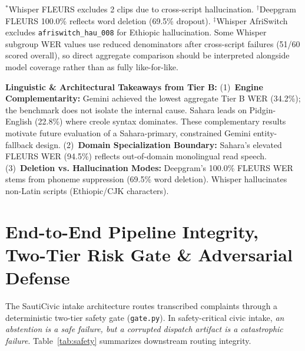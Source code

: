 \documentclass[9pt,a4paper]{extarticle}
\begin{document}
\vspace{1pt}
{\scriptsize $^*$Whisper FLEURS excludes 2 clips due to cross-script hallucination. $^\dagger$Deepgram FLEURS 100.0\% reflects word deletion (69.5\% dropout). $^\ddagger$Whisper AfriSwitch excludes \texttt{afriswitch\_hau\_008} for Ethiopic hallucination. Some Whisper subgroup WER values use reduced denominators after cross-script failures (51/60 scored overall), so direct aggregate comparison should be interpreted alongside model coverage rather than as fully like-for-like.}

\textbf{Linguistic \& Architectural Takeaways from Tier B:}
(1)~\textbf{Engine Complementarity:} Gemini achieved the lowest aggregate Tier B WER (34.2\%); the benchmark does not isolate the internal cause. Sahara leads on Pidgin-English (22.8\%) where creole syntax dominates. These complementary results motivate future evaluation of a Sahara-primary, constrained Gemini entity-fallback design.
(2)~\textbf{Domain Specialization Boundary:} Sahara's elevated FLEURS WER (94.5\%) reflects out-of-domain monolingual read speech.
(3)~\textbf{Deletion vs. Hallucination Modes:} Deepgram’s 100.0\% FLEURS WER stems from phoneme suppression (69.5\% word deletion). Whisper hallucinates non-Latin scripts (Ethiopic/CJK characters).

\pagebreak

\section{End-to-End Pipeline Integrity, Two-Tier Risk Gate \& Adversarial Defense}
\label{sec:safety}
The SautiCivic intake architecture routes transcribed complaints through a deterministic two-tier safety gate (\texttt{gate.py}). In safety-critical civic intake, \textit{an abstention is a safe failure, but a corrupted dispatch artifact is a catastrophic failure}. Table~\ref{tab:safety} summarizes downstream routing integrity.
\end{document}
